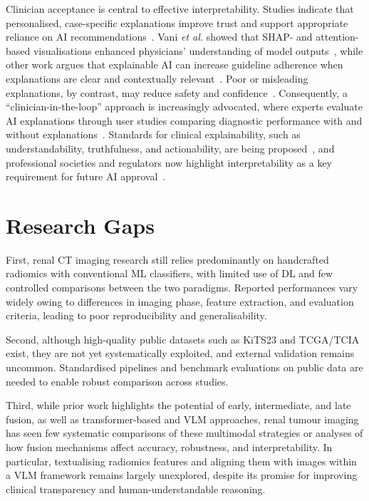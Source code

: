 Clinician acceptance is central to effective interpretability. Studies indicate that personalised, case-specific explanations improve trust and support appropriate reliance on AI recommendations~\cite{vani2025personalized}. Vani \textit{et al.} showed that SHAP- and attention-based visualisations enhanced physicians’ understanding of model outputs~\cite{vani2025personalized}, while other work argues that explainable AI can increase guideline adherence when explanations are clear and contextually relevant~\cite{abgrall2024should,houssein2025explainable}. Poor or misleading explanations, by contrast, may reduce safety and confidence~\cite{abgrall2024should,napravnik2025lessons}. Consequently, a “clinician-in-the-loop” approach is increasingly advocated, where experts evaluate AI explanations through user studies comparing diagnostic performance with and without explanations~\cite{napravnik2025lessons,vani2025personalized}. Standards for clinical explainability, such as understandability, truthfulness, and actionability, are being proposed~\cite{pahud2024orchestrating,jin2023guidelines}, and professional societies and regulators now highlight interpretability as a key requirement for future AI approval~\cite{abgrall2024should,houssein2025explainable}.





\section{Research Gaps}

First, renal CT imaging research still relies predominantly on handcrafted radiomics with conventional ML classifiers, with limited use of DL and few controlled comparisons between the two paradigms. Reported performances vary widely owing to differences in imaging phase, feature extraction, and evaluation criteria, leading to poor reproducibility and generalisability.

Second, although high-quality public datasets such as KiTS23 and TCGA/TCIA exist, they are not yet systematically exploited, and external validation remains uncommon. Standardised pipelines and benchmark evaluations on public data are needed to enable robust comparison across studies.

Third, while prior work highlights the potential of early, intermediate, and late fusion, as well as transformer-based and VLM approaches, renal tumour imaging has seen few systematic comparisons of these multimodal strategies or analyses of how fusion mechanisms affect accuracy, robustness, and interpretability. In particular, textualising radiomics features and aligning them with images within a VLM framework remains largely unexplored, despite its promise for improving clinical transparency and human-understandable reasoning.

